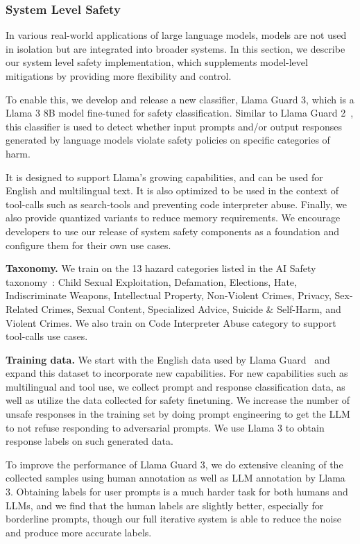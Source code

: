\subsubsection{System Level Safety}
\label{section:sls}                      

In various real-world applications of large language models, models are not used in isolation but are integrated into broader systems. In this section, we describe our system level safety implementation, which supplements model-level mitigations by providing more flexibility and control. 

To enable this, we develop and release a new classifier, Llama Guard 3, which is a Llama 3 8B model fine-tuned for safety classification. Similar to Llama Guard 2~\citep{metallamaguard2}, this classifier is used to detect whether input prompts and/or output responses generated by language models violate safety policies on specific categories of harm. 

It is designed to support Llama's growing capabilities, and can be used for English and multilingual text. It is also optimized to be used in the context of tool-calls such as search-tools and preventing code interpreter abuse. Finally, we also provide quantized variants to reduce memory requirements. We encourage developers to use our release of system safety components as a foundation and configure them for their own use cases.

\textbf{Taxonomy.}
We train on the 13 hazard categories listed in the AI Safety taxonomy~\citep{vidgen2024introducing}: Child Sexual Exploitation, Defamation, Elections, Hate, Indiscriminate Weapons, Intellectual Property, Non-Violent Crimes, Privacy, Sex-Related Crimes, Sexual Content, Specialized Advice, Suicide \& Self-Harm, and Violent Crimes. We also train on Code Interpreter Abuse category to support tool-calls use cases. 

\textbf{Training data.} We start with the English data used by Llama Guard~\citep{inan2023llamaguard} and expand this dataset to incorporate new capabilities. For new capabilities such as multilingual and tool use, we collect prompt and response classification data, as well as utilize the data collected for safety finetuning. We increase the number of unsafe responses in the training set by doing prompt engineering to get the LLM to not refuse responding to adversarial prompts. We use Llama 3 to obtain response labels on such generated data.

To improve the performance of Llama Guard 3, we do extensive cleaning of the collected samples using human annotation as well as LLM annotation by Llama 3. Obtaining labels for user prompts is a much harder task for both humans and LLMs, and we find that the human labels are slightly better, especially for borderline prompts, though our full iterative system is able to reduce the noise and produce more accurate labels.

